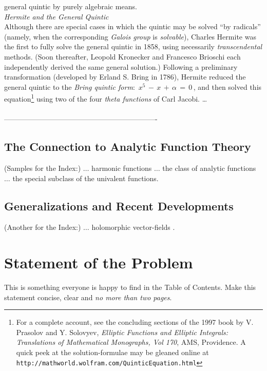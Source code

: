 \documentclass[11pt]{gthesis2}  %
\begin{document}
general quintic by purely algebraic means.
%
%
\\[.3cm]
\indent \emph{Hermite and the General Quintic}
\\[.3cm]
%
%
\indent Although there are special cases in which the quintic may
be solved ``by radicals'' (namely, when the corresponding
\emph{Galois group} is \emph{solvable}), Charles Hermite was the
first to fully solve the general quintic in 1858, using
necessarily \emph{transcendental} methods. (Soon thereafter,
Leopold Kronecker and Francesco Brioschi each independently
derived the same general solution.) Following a preliminary
transformation (developed by Erland S. Bring in 1786), Hermite
reduced the general quintic to the \emph{Bring quintic form}:
$\,x^{5}\,-\,x\,+\,\alpha\,=\,0\,$, and then solved this
equation\footnote{For a complete account, see the concluding
sections of the 1997 book by V. Prasolov and Y. Solovyev,
\emph{Elliptic Functions and Elliptic Integrals: Translations of
Mathematical Monographs, Vol 170}, AMS, Providence. A quick peek
at the solution-formulae may be gleaned online at
\texttt{http://mathworld.wolfram.com/QuinticEquation.html}\;}
using two of the four \emph{theta functions} of Carl Jacobi.
\;\;\dots
%
\\\\
----------------------------------------------------------------
\newpage
%
\subsection{The Connection to Analytic Function Theory}
\label{sub:conn-anal}
%
(Samples for the Index:) $\dots$ harmonic functions $\dots$ the
class of analytic functions $\dots$
 the special subclass of the univalent functions.
%
 
%
\newpage
%
\subsection{Generalizations and Recent Developments}
\label{sub:Gens}
%
(Another for the Index:) $\dots$ holomorphic vector-fields .
%
%
\newpage
%
\section{Statement of the Problem}
\label{sec:thesis-statement}
%
\noindent This is something everyone is happy to find in the Table
of Contents. Make this statement concise, clear and \emph{no more
than two pages}.
%
%
\newpage
%
\end{document}
